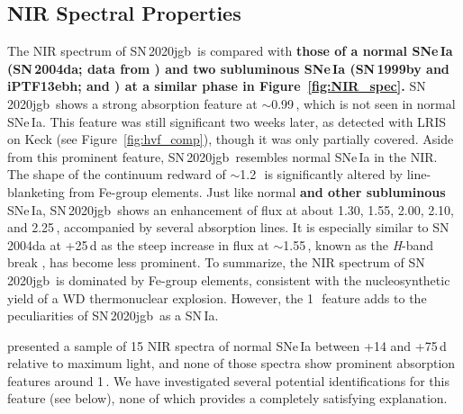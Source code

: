 \documentclass[twocolumn]{aastex631}
\newcommand{\sn}{SN\,2020jgb}
\newcommand{\revise}[1]{\textbf{#1}}
\begin{document}
\subsection{NIR Spectral Properties}
\label{sec:NIR_spec}
The NIR spectrum of \sn\ is compared with \revise{those of a normal SNe\,Ia (SN\,2004da; data from \citealp{Marion2009_NIR}) and two subluminous SNe\,Ia (SN\,1999by and iPTF13ebh; \citealp{Hoeflich_2002} and \citealp{Hsiao_13ebh_2015}) at a similar phase in Figure~\ref{fig:NIR_spec}.} \sn\ shows a strong absorption feature at $\sim$0.99\,\micron, which is not seen in normal SNe\,Ia. This feature was still significant two weeks later, as detected with LRIS on Keck (see Figure~\ref{fig:hvf_comp}), though it was only partially covered. Aside from this prominent feature, \sn\ resembles normal SNe\,Ia in the NIR. The shape of the continuum redward of $\sim$1.2\,\micron\ is significantly altered by line-blanketing from Fe-group elements. Just like normal \revise{and other subluminous} SNe\,Ia, \sn\ shows an enhancement of flux at about 1.30, 1.55, 2.00, 2.10, and 2.25\,\micron, accompanied by several  absorption lines. It is especially similar to SN\,2004da at +25\,d as the steep increase in flux at $\sim$1.55\,\micron, known as the \textit{H}-band break \citep{Hsiao_CSP_2019}, has become less prominent. To summarize, the NIR spectrum of \sn\ is dominated by Fe-group elements, consistent with the nucleosynthetic yield of a WD thermonuclear explosion. However, the  1\,\micron\ feature adds to the peculiarities of \sn\ as a SN\,Ia.

\citet{Marion2009_NIR} presented a sample of 15 NIR spectra of normal SNe\,Ia between +14 and +75\,d relative to maximum light, and none of those spectra show prominent absorption features around 1\,\micron. We have investigated several potential identifications for this feature (see below), none of which provides a completely satisfying explanation.
\end{document}
